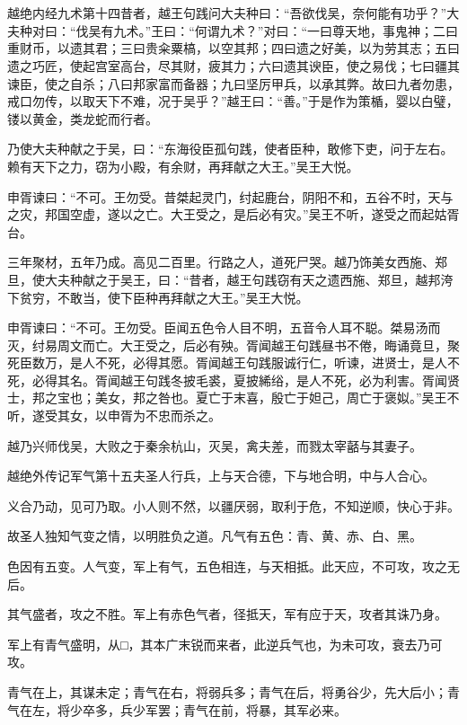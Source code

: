 \documentclass[12pt,UTF8]{ctexbook}
\begin{document}
\part{}

越绝内经九术第十四昔者，越王句践问大夫种曰：“吾欲伐吴，奈何能有功乎？”大夫种对曰：“伐吴有九术。”王曰：“何谓九术？”对曰：“一曰尊天地，事鬼神；二曰重财币，以遗其君；三曰贵籴粟槁，以空其邦；四曰遗之好美，以为劳其志；五曰遗之巧匠，使起宫室高台，尽其财，疲其力；六曰遗其谀臣，使之易伐；七曰疆其谏臣，使之自杀；八曰邦家富而备器；九曰坚厉甲兵，以承其弊。故曰九者勿患，戒口勿传，以取天下不难，况于吴乎？”越王曰：“善。”于是作为策楯，婴以白璧，镂以黄金，类龙蛇而行者。

乃使大夫种献之于吴，曰：“东海役臣孤句践，使者臣种，敢修下吏，问于左右。赖有天下之力，窃为小殿，有余财，再拜献之大王。”吴王大悦。

申胥谏曰：“不可。王勿受。昔桀起灵门，纣起鹿台，阴阳不和，五谷不时，天与之灾，邦国空虚，遂以之亡。大王受之，是后必有灾。”吴王不听，遂受之而起姑胥台。

三年聚材，五年乃成。高见二百里。行路之人，道死尸哭。越乃饰美女西施、郑旦，使大夫种献之于吴王，曰：“昔者，越王句践窃有天之遗西施、郑旦，越邦洿下贫穷，不敢当，使下臣种再拜献之大王。”吴王大悦。

申胥谏曰：“不可。王勿受。臣闻五色令人目不明，五音令人耳不聪。桀易汤而灭，纣易周文而亡。大王受之，后必有殃。胥闻越王句践昼书不倦，晦诵竟旦，聚死臣数万，是人不死，必得其愿。胥闻越王句践服诚行仁，听谏，进贤士，是人不死，必得其名。胥闻越王句践冬披毛裘，夏披絺绤，是人不死，必为利害。胥闻贤士，邦之宝也；美女，邦之咎也。夏亡于末喜，殷亡于妲己，周亡于褒姒。”吴王不听，遂受其女，以申胥为不忠而杀之。

越乃兴师伐吴，大败之于秦余杭山，灭吴，禽夫差，而戮太宰嚭与其妻子。

越绝外传记军气第十五夫圣人行兵，上与天合德，下与地合明，中与人合心。

义合乃动，见可乃取。小人则不然，以疆厌弱，取利于危，不知逆顺，快心于非。

故圣人独知气变之情，以明胜负之道。凡气有五色：青、黄、赤、白、黑。

色因有五变。人气变，军上有气，五色相连，与天相抵。此天应，不可攻，攻之无后。

其气盛者，攻之不胜。军上有赤色气者，径抵天，军有应于天，攻者其诛乃身。

军上有青气盛明，从□，其本广末锐而来者，此逆兵气也，为未可攻，衰去乃可攻。

青气在上，其谋未定；青气在右，将弱兵多；青气在后，将勇谷少，先大后小；青气在左，将少卒多，兵少军罢；青气在前，将暴，其军必来。
\end{document}
